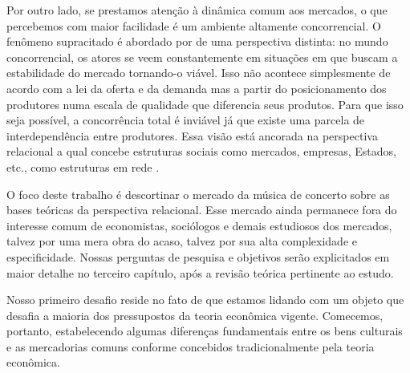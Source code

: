 \documentclass[a4paper, 12pt, openright, oneside, german, french, english, brazil]{abntex2}
\begin{document}
	
	Por outro lado, se prestamos atenção à dinâmica comum aos mercados, o que percebemos com maior facilidade é um ambiente altamente concorrencial. O fenômeno supracitado é abordado por  de uma perspectiva distinta: no mundo concorrencial, os atores se veem constantemente em situações em que buscam a estabilidade do mercado tornando-o viável. Isso não acontece simplesmente de acordo com a lei da oferta e da demanda mas a partir do posicionamento dos produtores numa escala de qualidade que diferencia seus produtos. Para que isso seja possível, a concorrência total é inviável já que existe uma parcela de interdependência entre produtores. Essa visão está ancorada na perspectiva relacional a qual concebe estruturas sociais como mercados, empresas, Estados, etc., como estruturas em rede \cite{white2008,white2002markets,lazega2014redes}.
	
	O foco deste trabalho é descortinar o mercado da música de concerto sobre as bases teóricas da perspectiva relacional. Esse mercado ainda permanece fora do interesse comum de economistas, sociólogos e demais estudiosos dos mercados, talvez por uma mera obra do acaso, talvez por sua alta complexidade e especificidade. Nossas perguntas de pesquisa e objetivos serão explicitados em maior detalhe no terceiro capítulo, após a revisão teórica pertinente ao estudo.
	
	Nosso primeiro desafio reside no fato de que estamos lidando com um objeto que desafia a maioria dos pressupostos da teoria econômica vigente. Comecemos, portanto, estabelecendo algumas diferenças fundamentais entre os bens culturais e as mercadorias comuns conforme concebidos tradicionalmente pela teoria econômica.
	
\end{document}

